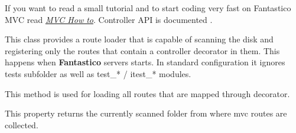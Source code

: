 \documentclass[letterpaper,10pt,english]{sphinxmanual}
\begin{document}
If you want to read a small tutorial and to start coding very fast on Fantastico MVC read {\hyperref[how_to/mvc_how_to::doc]{\emph{MVC How to}}}. Controller
API is documented .

\begin{fulllineitems}
\label{features/mvc:fantastico.mvc.controller_registrator.ControllerRouteLoader}
This class provides a route loader that is capable of scanning the disk and registering only the routes that 
contain a controller decorator in them. This happens when \textbf{Fantastico} servers starts. In standard configuration
it ignores tests subfolder as well as test\_* / itest\_* modules.

\begin{fulllineitems}
\label{features/mvc:fantastico.mvc.controller_registrator.ControllerRouteLoader.load_routes}
This method is used for loading all routes that are mapped through 
{\hyperref[features/mvc:fantastico.mvc.controller_decorators.Controller]{}} decorator.

\end{fulllineitems}


\begin{fulllineitems}
\label{features/mvc:fantastico.mvc.controller_registrator.ControllerRouteLoader.scanned_folder}
This property returns the currently scanned folder from where mvc routes are collected.

\end{fulllineitems}


\end{fulllineitems}

\end{document}
